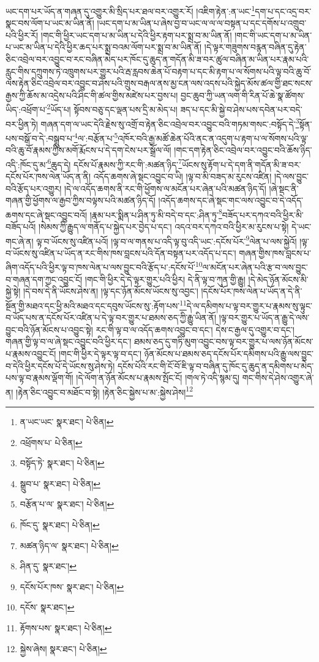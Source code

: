 ཡང་དག་པར་ཡོད་ན་གཞན་དུ་འགྱུར་མི་སྲིད་པར་ཐལ་བར་འགྱུར་རོ། །འཇིག་རྟེན་:ན་ཡང་\footnote{ན་ཡང་ཡང་  སྣར་ཐང་།  པེ་ཅིན། }དག་པ་དང་འདྲ་བར་སྣང་བས་ལོག་པ་ཡང་མ་ཡིན་ནོ། །ཡང་དག་པ་མ་ཡིན་པ་ཞེས་བྱ་བ་ཡང་ལ་ལ་ལ་བསྟན་པ་དང་དགོས་པ་འགྲུབ་པའི་ཕྱིར་རོ། །གང་གི་ཕྱིར་ཡང་དག་པ་མ་ཡིན་པ་དེའི་ཕྱིར་རྟག་པར་སྨྲ་བ་མ་ཡིན་ནོ། །གང་གི་ཡང་དག་པ་མ་ཡིན་པ་ཡང་མ་ཡིན་པ་དེའི་ཕྱིར་ཆད་པར་སྨྲ་བའམ་ལོག་པར་སྨྲ་བ་མ་ཡིན་ནོ། །དེ་ལྟར་གཟུགས་བརྙན་བཞིན་དུ་རྟེན་ཅིང་འབྲེལ་བར་འབྱུང་བ་རང་བཞིན་མེད་པར་ཁོང་དུ་ཆུད་ན་གདོན་མི་ཟ་བར་ཚུལ་བཞིན་མ་ཡིན་པར་རྣམ་པའི་རླུང་གིས་དཀྲུགས་ཏེ་འཁྲུགས་པར་གྱུར་པའི་རྦ་རླབས་ཆེན་པོ་བརྟག་པ་དང་མི་རྟག་པ་ལ་སོགས་པའི་ལྟ་བའི་ཆུ་བོ་ལས་རྟེན་ཅིང་འབྲེལ་བར་འབྱུང་བ་ཤེས་པའི་གྲུས་བརྒལ་ནས་མྱ་ངན་ལས་འདས་པའི་སྐྱེད་མོས་ཚལ་གྱི་ཐང་སངས་རྒྱས་ཀྱི་ཆོས་མ་འདྲེས་པའི་ཤིང་གི་ཚལ་གྱིས་མཛེས་པར་བྱས་པ། བྱང་ཆུབ་ཀྱི་ཡན་ལག་གི་རིན་པོ་ཆེ་སྣ་ཚོགས་ཡིད་:འཕྲོག་པ་\footnote{འཕྲོགས་པ་  པེ་ཅིན། }ཡོད་པ། སྟོབས་བཅུ་དང་ལྡན་པས་དྲི་མ་མེད་པ། ཟད་པ་དང་མི་སྐྱེ་བ་ཤེས་པས་དབེན་པར་བདེ་བར་ཕྱིན་ཏེ། གཞན་དག་ལ་ཡང་དེའི་རྗེས་སུ་འགྲོ་བ་རྟེན་ཅིང་འབྲེལ་བར་འབྱུང་བའི་གཏམ་གསང་:བསྟོད་དེ་\footnote{བསྟོད་ཏེ་  སྣར་ཐང་།  པེ་ཅིན། }སྟོན་པས་བསྒོ་བ་དེ་:བསྒྲུབ་པ་\footnote{སྒྲུབ་པ་  སྣར་ཐང་།  པེ་ཅིན། }ལ་:བརྩོན་པ་\footnote{བརྩོན་པ་ལ་  སྣར་ཐང་།  པེ་ཅིན། }འཁོར་བའི་རྒྱ་མཚོ་ཆེན་པོའི་ནང་ན་འདུག་པ་རྟག་པ་ལ་སོགས་པའི་ལྟ་བའི་ཆུ་བོ་རྣམས་ཀྱིས་མགོ་རྨོངས་པ་དེ་དག་ངེས་པར་སྒྲོལ་ལོ། །གང་དག་རྟེན་ཅིང་འབྲེལ་བར་འབྱུང་བའི་ཆོས་ཉིད་འདི་:ཁོང་དུ་མ་\footnote{ཁོང་དུ་  སྣར་ཐང་།  པེ་ཅིན། }ཆུད་དེ། དངོས་པོ་རྣམས་ཀྱི་རང་གི་:མཚན་ཉིད་\footnote{མཚན་ཉིད་ལ་  སྣར་ཐང་།  པེ་ཅིན། }ཡོངས་སུ་རྟོག་པ་དེ་དག་ནི་གདོན་མི་ཟ་བར་དངོས་པོར་ཁས་ལེན་ཡོད་ན་ནི། འདོད་ཆགས་ཞེ་སྡང་འབྱུང་བ་ཡི། །ལྟ་བ་མི་བཟད་མ་རུངས་འཛིན། །དེ་ལས་བྱུང་བའི་རྩོད་པར་འགྱུར། །དེ་ལ་འདོད་ཆགས་ནི་རང་གི་ཕྱོགས་ལ་མངོན་པར་ཞེན་པའི་མཚན་ཉིད་དོ། །ཞེ་སྡང་ནི་གཞན་གྱི་ཕྱོགས་ལ་རྒྱབ་ཀྱིས་བལྟས་པའི་མཚན་ཉིད་དོ། །འདོད་ཆགས་དང་ཞེ་སྡང་གང་ལས་འབྱུང་བ་དེ་འདོད་ཆགས་དང་ཞེ་སྡང་འབྱུང་བའོ། །རྣམ་པར་སྨིན་པ་ཤིན་ཏུ་མི་བདེ་བ་དང་:ཤིན་ཏུ་\footnote{ཤིན་དུ་  སྣར་ཐང་། }བཟོད་པར་དཀའ་བའི་ཕྱིར་མི་བཟོད་པའོ། །སེམས་ཀྱི་རྒྱུད་ལ་གནོད་པ་སྐྱེད་པར་བྱེད་པ་དང་། འདའ་བར་དཀའ་བའི་ཕྱིར་མ་རུངས་པ་སྟེ། དེ་ཡང་གང་ཞེ་ན། ལྟ་བ་ཡོངས་སུ་འཛིན་པའོ། །ལྟ་བ་ལ་གནས་པ་འདི་ལྟ་བུ་འདི་ཡང་:དངོས་པོར་\footnote{དངོས་པོར་ཁས་  སྣར་ཐང་།  པེ་ཅིན། }ལེན་པ་ལས་སྐྱེའོ། །ལྟ་བ་ཡོངས་སུ་འཛིན་པ་ཡོད་ན་རང་གིས་ཁས་བླངས་པའི་དོན་བསྟན་པར་འདོད་པ་དང་། གཞན་གྱིས་ཁས་བླངས་པ་ཞིག་འདོད་པའི་ཕྱིར་ལྟ་བ་ཁས་ལེན་པ་ལས་བྱུང་བའི་རྩོད་པ་:དངོས་པོ་\footnote{དངོས་  སྣར་ཐང་། }ལ་མངོན་པར་ཞེན་པའི་རྩ་བ་ལས་བྱུང་བ་གཞན་དག་ཀྱང་འབྱུང་ངོ། །གང་གི་ཕྱིར་དེ་དེ་ལྟར་གྱུར་པའི་ཕྱིར། དེ་ནི་ལྟ་བ་ཀུན་གྱི་རྒྱུ། །དེ་མེད་ཉོན་མོངས་མི་སྐྱེ་སྟེ། །དེ་བས་དེ་ནི་ཡོངས་ཤེས་ན། །ལྟ་དང་ཉོན་མོངས་ཡོངས་སུ་འབྱང་། །དངོས་པོར་ཁས་ལེན་པ་ཡོད་ན་དེ་ནི་སྔོན་གྱི་མཐའ་དང་ཕྱི་མའི་མཐའ་དང་དབུས་ཡོངས་སུ་:རྟོག་པས་\footnote{རྟོགས་པས་  སྣར་ཐང་།  པེ་ཅིན། }དེ་ལ་དམིགས་པ་ལྟ་བར་གྱུར་པ་རྣམས་སུ་ལྟུང་བ་ཡོད་པས་ན་དངོས་པོར་འཛིན་པ་དེ་ལྟ་བར་གྱུར་པ་ཐམས་ཅད་ཀྱི་རྒྱུ་ཡིན་ནོ། །ལྟ་བར་གྱུར་པ་ཡོད་ན་རྒྱུ་དེ་ལས་བྱུང་བའི་ཉོན་མོངས་པ་འབྱུང་སྟེ། རང་གི་ལྟ་བ་ལ་འདོད་ཆགས་འབྱུང་བ་དང་། དེས་ང་རྒྱལ་དུ་འགྱུར་བ་དང་། གཞན་གྱི་ལྟ་བ་ལ་ཞེ་སྡང་འབྱུང་བའི་ཕྱིར་དང་། ཐམས་ཅད་དུ་གཏི་མུག་འབྱུང་བས་ལྟ་བར་གྱུར་པ་ལས་ཉོན་མོངས་པ་རྣམས་འབྱུང་ངོ། །གང་གི་ཕྱིར་དེ་ལྟར་ལྟ་བ་དང་། ཉོན་མོངས་པ་ཐམས་ཅད་དངོས་པོར་དམིགས་པའི་རྒྱུ་ལས་བྱུང་བ་དེའི་ཕྱིར་དངོས་པོ་དེ་ཡོངས་སུ་ཤེས་ཏེ། དངོས་པོའི་རང་གི་ངོ་བོ་ཇི་ལྟ་བ་བཞིན་དུ་ཁོང་དུ་ཆུད་ན་དམིགས་པ་མེད་པས་ལྟ་བ་རྣམས་ལྡོག་གོ། །དེ་ལོག་ན་ཉོན་མོངས་པ་རྣམས་སྤོང་ངོ། །གལ་ཏེ་འདི་སྙམ་དུ། གང་གིས་དེ་ཤེས་འགྱུར་ཞེ་ན། །རྟེན་ཅིང་འབྱུང་བ་མཐོང་བ་སྟེ། །རྟེན་ཅིང་སྐྱེས་པ་མ་:སྐྱེས་ཤེས།\footnote{སྐྱེས་ཞེས།  སྣར་ཐང་།  པེ་ཅིན། } 